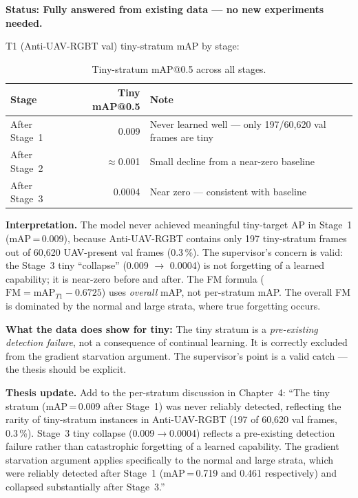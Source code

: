 \textbf{Status: Fully answered from existing data --- no new experiments needed.}

\vspace{0.5em}
\noindent T1 (Anti-UAV-RGBT val) tiny-stratum mAP by stage:

\begin{table}[h]
\centering
\caption{Tiny-stratum mAP@0.5 across all stages.}
\small
\begin{tabular}{lrl}
\hline
\textbf{Stage} & \textbf{Tiny mAP@0.5} & \textbf{Note} \\
\hline
After Stage~1 & 0.009 & Never learned well --- only 197/60,620 val frames are tiny \\
After Stage~2 & $\approx$0.001 & Small decline from a near-zero baseline \\
After Stage~3 & 0.0004 & Near zero --- consistent with baseline \\
\hline
\end{tabular}
\end{table}

\noindent\textbf{Interpretation.} The model never achieved meaningful
tiny-target AP in Stage~1 (mAP\,=\,0.009), because Anti-UAV-RGBT contains
only 197 tiny-stratum frames out of 60,620 UAV-present val frames (0.3\,\%).
The supervisor's concern is valid: the Stage~3 tiny ``collapse'' (0.009
$\to$ 0.0004) is not forgetting of a learned capability; it is near-zero
before and after. The FM formula ($\mathrm{FM} = \mathrm{mAP}_{T1} -
0.6725$) uses \textit{overall} mAP, not per-stratum mAP. The overall FM
is dominated by the normal and large strata, where true forgetting occurs.

\vspace{0.5em}
\noindent\textbf{What the data does show for tiny:}
The tiny stratum is a \textit{pre-existing detection failure}, not a
consequence of continual learning. It is correctly excluded from the
gradient starvation argument. The supervisor's point is a valid catch ---
the thesis should be explicit.

\vspace{0.5em}
\noindent\textbf{Thesis update.} Add to the per-stratum discussion in
Chapter~4: ``The tiny stratum (mAP\,=\,0.009 after Stage~1) was never
reliably detected, reflecting the rarity of tiny-stratum instances in
Anti-UAV-RGBT (197 of 60,620 val frames, 0.3\,\%). Stage~3 tiny collapse
(0.009$\to$0.0004) reflects a pre-existing detection failure rather than
catastrophic forgetting of a learned capability. The gradient starvation
argument applies specifically to the normal and large strata, which were
reliably detected after Stage~1 (mAP\,=\,0.719 and 0.461 respectively)
and collapsed substantially after Stage~3.''

